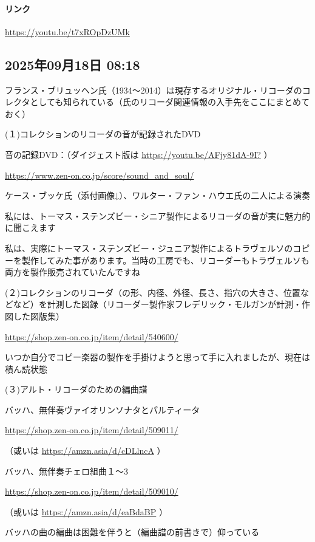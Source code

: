 \paragraph{リンク}
\url{https://youtu.be/t7xROpDzUMk}

\subsection*{2025年09月18日 08:18}

フランス・ブリュッヘン氏（1934〜2014）は現存するオリジナル・リコーダのコレクタとしても知られている（氏のリコーダ関連情報の入手先をここにまとめておく）

(１)コレクションのリコーダの音が記録されたDVD

音の記録DVD：（ダイジェスト版は \url{https://youtu.be/AFjy81dA-9I?} ）

\url{https://www.zen-on.co.jp/score/sound_and_soul/}

ケース・ブッケ氏（添付画像↓）、ワルター・ファン・ハウエ氏の二人による演奏

私には、トーマス・ステンズビー・シニア製作によるリコーダの音が実に魅力的に聞こえます

私は、実際にトーマス・ステンズビー・ジュニア製作によるトラヴェルソのコピーを製作してみた事があります。当時の工房でも、リコーダーもトラヴェルソも両方を製作販売されていたんですね

(２)コレクションのリコーダ（の形、内径、外径、長さ、指穴の大きさ、位置などなど）を計測した図録（リコーダー製作家フレデリック・モルガンが計測・作図した図版集）

\url{https://shop.zen-on.co.jp/item/detail/540600/}

いつか自分でコピー楽器の製作を手掛けようと思って手に入れましたが、現在は積ん読状態

(３)アルト・リコーダのための編曲譜

バッハ、無伴奏ヴァイオリンソナタとパルティータ

\url{https://shop.zen-on.co.jp/item/detail/509011/}

（或いは \url{https://amzn.asia/d/cDLlncA} ）

バッハ、無伴奏チェロ組曲１〜3

\url{https://shop.zen-on.co.jp/item/detail/509010/}

（或いは \url{https://amzn.asia/d/eaBdaBP} ）

バッハの曲の編曲は困難を伴うと（編曲譜の前書きで）仰っている

